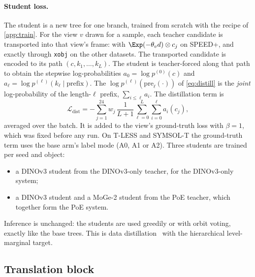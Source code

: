 \paragraph{Student loss.}
The student is a new tree for one branch, trained from scratch with the recipe of \cref{app:train}. For the view $v$ drawn for a sample, each teacher candidate is transported into that view's frame: with $\Exp(-\theta_v d)\otimes c_j$ on SPEED+, and exactly through \texttt{xobj} on the other datasets. The transported candidate is encoded to its path $(c,k_1,\dots,k_L)$. The student is teacher-forced along that path to obtain the stepwise log-probabilities $a_0=\log p^{(0)}(c)$ and $a_\ell=\log p^{(\ell)}(k_\ell\mid\text{prefix})$. The $\log p^{(\ell)}(\mathrm{pre}_\ell(\cdot))$ of \cref{eq:distill} is the \emph{joint} log-probability of the length-$\ell$ prefix, $\sum_{i\le\ell}a_i$. The distillation term is
\begin{equation}
  \mathcal{L}_{\text{dist}}=-\sum_{j=1}^{24}w_j\,\frac{1}{L+1}\sum_{\ell=0}^{L}\sum_{i=0}^{\ell}a_i(c_j),
\end{equation}
averaged over the batch. It is added to the view's ground-truth loss with $\beta=1$, which was fixed before any run. On T-LESS and SYMSOL-T the ground-truth term uses the base arm's label mode (A0, A1 or A2). Three students are trained per seed and object:
\begin{itemize}
  \item a DINOv3 student from the DINOv3-only teacher, for the DINOv3-only system;
  \item a DINOv3 student and a MoGe-2 student from the PoE teacher, which together form the PoE system.
\end{itemize}
Inference is unchanged: the students are used greedily or with orbit voting, exactly like the base trees. This is data distillation~\cite{radosavovic2018data,hinton2015distilling} with the hierarchical level-marginal target.

\subsection{Translation block}\label{app:trans}

